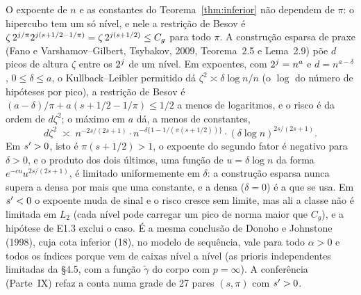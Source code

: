 \documentclass[11pt,a4paper]{article}
\begin{document}
\begin{remark}\label{rem:esparso}
O expoente de $n$ e as constantes do Teorema~\ref{thm:inferior} não dependem
de $\pi$: o hipercubo tem um só nível, e nele a restrição de Besov é
$\zeta\,2^{j/\pi}2^{j(s+1/2-1/\pi)} = \zeta\,2^{j(s+1/2)} \le C_{g}$
para todo $\pi$. A construção esparsa de praxe (Fano e Varshamov--Gilbert,
Tsybakov, 2009, Teorema~2.5 e Lema~2.9) põe $d$ picos de altura $\zeta$ entre
os $2^{j}$ de um nível. Em expoentes, com $2^{j} = n^{a}$ e $d =
n^{a-\delta}$, $0 \le \delta \le a$, o Kullback--Leibler permitido dá
$\zeta^{2} \asymp \delta\log n/n$ (o $\log$ do número de hipóteses por pico),
a restrição de Besov é $(a-\delta)/\pi + a(s + 1/2 - 1/\pi) \le 1/2$ a menos
de logaritmos, e o risco é da ordem de $d\zeta^{2}$; o máximo em $a$ dá, a
menos de constantes,
\[
  d\zeta^{2} \;\asymp\; n^{-2s/(2s+1)}\cdot
  n^{-\delta\{1 - 1/(\pi(s+1/2))\}}\cdot(\delta\log n)^{2s/(2s+1)} .
\]
Em $s' > 0$, isto é $\pi(s+1/2) > 1$, o expoente do segundo fator é
negativo para $\delta > 0$, e o produto dos dois últimos, uma função de
$u = \delta\log n$ da forma $e^{-cu}u^{2s/(2s+1)}$, é limitado uniformemente
em $\delta$: a construção esparsa nunca supera a densa por mais que uma
constante, e a densa ($\delta = 0$) é a que se usa. Em $s' < 0$ o
expoente muda de sinal e o risco cresce sem limite, mas ali a classe não é
limitada em $L_{2}$ (cada nível pode carregar um pico de norma maior que
$C_{g}$), e a hipótese de E1.3 exclui o caso. É a mesma conclusão de Donoho e
Johnstone (1998), cuja cota inferior (18), no modelo de sequência, vale para
todo $\alpha > 0$ e todos os índices porque vem de caixas nível a nível (as
prioris independentes limitadas da §4.5, com a função $\tilde\gamma$ do corpo
com $p = \infty$). A conferência (Parte~IX) refaz a conta numa grade de 27
pares $(s,\pi)$ com $s' > 0$.
\end{remark}
\end{document}
